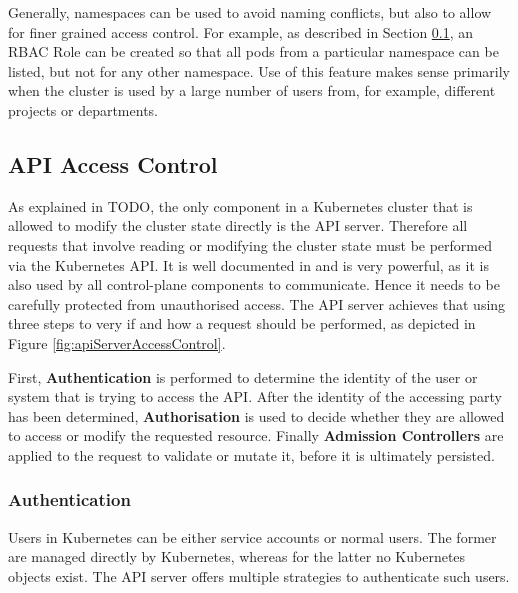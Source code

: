 Generally, namespaces can be used to avoid naming conflicts, but also to allow for finer grained access control. For example, as described in Section \ref{sec:apiAccessControl}, an RBAC Role can be created so that all pods from a particular namespace can be listed, but not for any other namespace. Use of this feature makes sense primarily when the cluster is used by a large number of users from, for example, different projects or departments.


\subsection{API Access Control} \label{sec:apiAccessControl}

As explained in TODO, the only component in a Kubernetes cluster that is allowed to modify the cluster state directly is the API server. Therefore all requests that involve reading or modifying the cluster state must be performed via the Kubernetes API. It is well documented in \cite{k8sdocsApi} and is very powerful, as it is also used by all control-plane components to communicate. Hence it needs to be carefully protected from unauthorised access. The API server achieves that using three steps to very if and how a request should be performed, as depicted in Figure \ref{fig:apiServerAccessControl}.


First, \textbf{Authentication} is performed to determine the identity of the user or system that is trying to access the API. After the identity of the accessing party has been determined, \textbf{Authorisation} is used to decide whether they are allowed to access or modify the requested resource. Finally \textbf{Admission Controllers} are applied to the request to validate or mutate it, before it is ultimately persisted.

\subsubsection{Authentication} \label{authentication}

Users in Kubernetes can be either service accounts or normal users. The former are managed directly by Kubernetes, whereas for the latter no Kubernetes objects exist. The API server offers multiple strategies to authenticate such users. 


